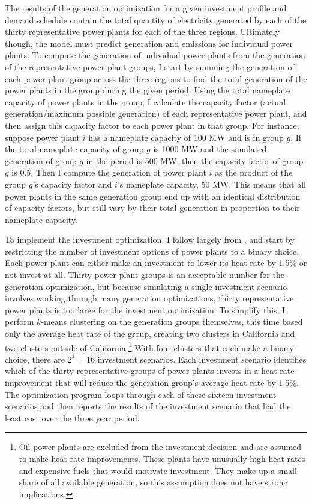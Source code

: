 The results of the generation optimization for a given investment profile and demand schedule contain the total quantity of electricity generated by each of the thirty representative power plants for each of the three regions. Ultimately though, the model must predict generation and emissions for individual power plants. To compute the generation of individual power plants from the generation of the representative power plant groups, I start by summing the generation of each power plant group across the three regions to find the total generation of the power plants in the group during the given period. Using the total nameplate capacity of power plants in the group, I calculate the capacity factor (actual generation/maximum possible generation) of each representative power plant, and then assign this capacity factor to each power plant in that group. For instance, suppose power plant $i$ has a nameplate capacity of 100 MW and is in group $g$. If the total nameplate capacity of group $g$ is 1000 MW and the simulated generation of group $g$ in the period is 500 MW, then the capacity factor of group $g$ is 0.5. Then I compute the generation of power plant $i$ as the product of the group $g$'s capacity factor and $i$'s nameplate capacity, 50 MW. This means that all power plants in the same generation group end up with an identical distribution of capacity factors, but still vary by their total generation in proportion to their nameplate capacity. 

To implement the investment optimization, I follow largely from \cite{weber2021dynamic}, and start by restricting the number of investment options of power plants to a binary choice. Each power plant can either make an investment to lower its heat rate by 1.5\% or not invest at all. Thirty power plant groups is an acceptable number for the generation optimization, but because simulating a single investment scenario involves working through many generation optimizations, thirty representative power plants is too large for the investment optimization. To simplify this, I perform $k$-means clustering on the generation groups themselves, this time based only the average heat rate of the group, creating two clusters in California and two clusters outside of California.\footnote{Oil power plants are excluded from the investment decision and are assumed to make heat rate improvements. These plants have unusually high heat rates and expensive fuels that would motivate investment. They make up a small share of all available generation, so this assumption does not have strong implications.} With four clusters that each make a binary choice, there are $2^4 = 16$ investment scenarios. Each investment scenario identifies which of the thirty representative groups of power plants invests in a heat rate improvement that will reduce the generation group's average heat rate by 1.5\%. The optimization program loops through each of these sixteen investment scenarios and then reports the results of the investment scenario that had the least cost over the three year period. 


